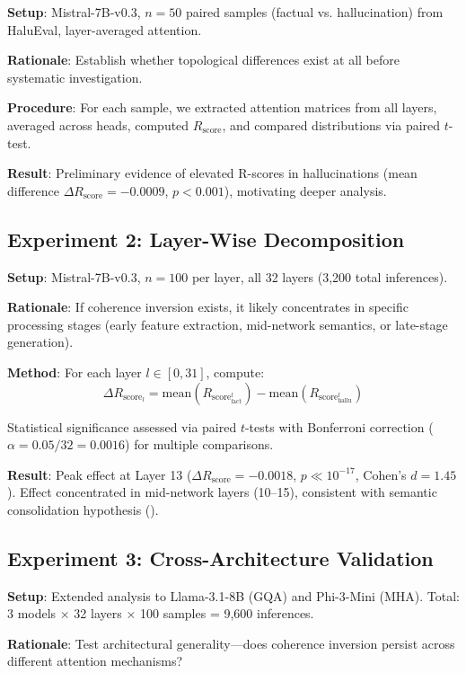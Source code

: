 \documentclass[11pt,twocolumn]{article}
\newcommand{\rscore}{R_{\text{score}}}
\begin{document}
\textbf{Setup}: Mistral-7B-v0.3, $n=50$ paired samples (factual vs. hallucination) from HaluEval, layer-averaged attention.

\textbf{Rationale}: Establish whether topological differences exist at all before systematic investigation.

\textbf{Procedure}: For each sample, we extracted attention matrices from all layers, averaged across heads, computed $\rscore$, and compared distributions via paired $t$-test.

\textbf{Result}: Preliminary evidence of elevated R-scores in hallucinations (mean difference $\Delta \rscore = -0.0009$, $p < 0.001$), motivating deeper analysis.

\subsection{Experiment 2: Layer-Wise Decomposition}

\textbf{Setup}: Mistral-7B-v0.3, $n=100$ per layer, all 32 layers (3,200 total inferences).

\textbf{Rationale}: If coherence inversion exists, it likely concentrates in specific processing stages (early feature extraction, mid-network semantics, or late-stage generation).

\textbf{Method}: For each layer $l \in [0, 31]$, compute:
\begin{equation}
\Delta \rscore_l = \text{mean}(\rscore_{\text{fact}}^l) - \text{mean}(\rscore_{\text{hallu}}^l)
\end{equation}

Statistical significance assessed via paired $t$-tests with Bonferroni correction ($\alpha = 0.05/32 = 0.0016$) for multiple comparisons.

\textbf{Result}: Peak effect at Layer 13 ($\Delta \rscore = -0.0018$, $p \ll 10^{-17}$, Cohen's $d = 1.45$). Effect concentrated in mid-network layers (10--15), consistent with semantic consolidation hypothesis ().

\subsection{Experiment 3: Cross-Architecture Validation}

\textbf{Setup}: Extended analysis to Llama-3.1-8B (GQA) and Phi-3-Mini (MHA). Total: 3 models $\times$ 32 layers $\times$ 100 samples = 9,600 inferences.

\textbf{Rationale}: Test architectural generality---does coherence inversion persist across different attention mechanisms?
\end{document}
